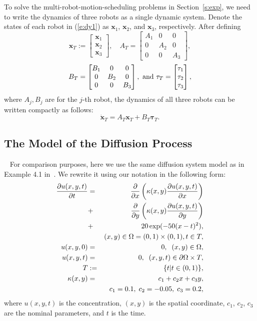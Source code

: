To solve the multi-robot-motion-scheduling problems in Section~\ref{s:exp}, we need to write the dynamics of three robots as a single dynamic system. Denote the states of each robot in (\ref{e:dy1}) as $\mathbf{x}_1$, $\mathbf{x}_2$, and $\mathbf{x}_3$, respectively.
  After defining
    $$\mathbf{x}_T :=
    \begin{bmatrix}
        \mathbf{x}_1 \\
        \mathbf{x}_2 \\
        \mathbf{x}_3
    \end{bmatrix},
    \quad
    A_T=
    \begin{bmatrix}
        A_1   & 0 & 0 \\
        0   & A_2 & 0 \\
        0   & 0 & A_3
    \end{bmatrix},
    $$
    $$B_T=
    \begin{bmatrix}
        B_1 & 0 & 0 \\
        0 & B_2 & 0 \\
        0 & 0 & B_3
    \end{bmatrix},
    {\rm \ and \ }
    \mathbf{\tau}_T=
    \begin{bmatrix}
        \mathbf{\tau}_1 \\
        \mathbf{\tau}_2 \\
        \mathbf{\tau}_3
    \end{bmatrix}, $$
   where $A_j, B_j$ are for the $j$-th robot,  the dynamics of all three robots can be written compactly as follows:
    \begin{equation}
        \label{e:dd3rob}
        \mathbf{\dot x}_T = A_T \mathbf{x}_T + B_T \mathbf{\tau}_T.
    \end{equation}

\subsection{The Model of the Diffusion Process}~\label{s:mod}
For comparison purposes, here we use the same  diffusion system model as in  Example 4.1 in~\cite{UcinskiOptDPS05}. We rewrite it using our notation in the following form:
\begin{eqnarray*}
    \frac{\partial u(x,y,t)}{\partial t} &=& \frac{\partial}{\partial x}\left(\kappa(x,y) \frac{\partial u(x,y,t)}{\partial x}  \right) \cr
    &+&   \frac{\partial }{\partial y}\left(\kappa(x,y) \frac{\partial u(x,y,t)}{\partial y} \right) \cr
    &+& 20 \exp(-50(x-t)^2), \cr
    & & (x,y) \in \Omega=(0,1)\times (0,1), t\in T, \cr
    u(x,y,0) &=& 0, \;\; (x,y) \in \Omega, \cr
    u(x,y,t) &=& 0, \;\; (x,y,t)\in \partial \Omega \times T, \cr
    T &:=& \{t | t\in(0,1) \}, \cr
    \kappa(x,y) &=& c_1 + c_2 x + c_3 y, \cr
    & & c_1=0.1,\; c_2=-0.05,\; c_3=0.2,
\end{eqnarray*}
where $u(x,y,t)$ is the concentration, $(x,y)$ is the spatial coordinate, $c_1$, $c_2$, $c_3$ are the nominal parameters, and $t$ is the time.


